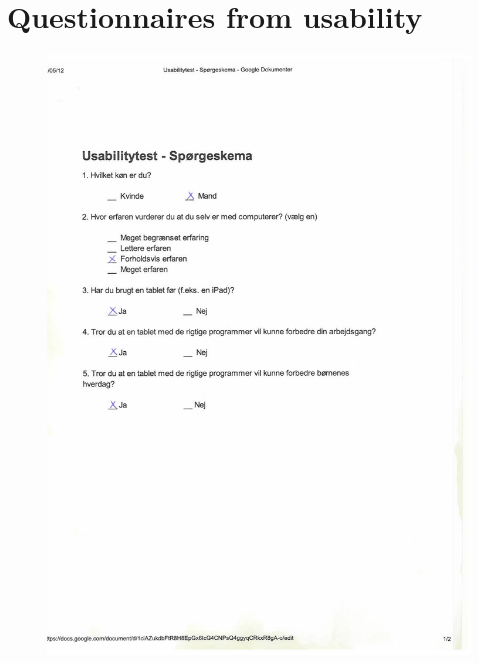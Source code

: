 \chapter{Questionnaires from usability}

\label{questionnaires}

\begin{figure}
	\centering
		\includegraphics{input/appendices/demo_d1.pdf}
	\label{fig:demo_t}
\end{figure}

